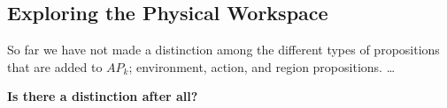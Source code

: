 \subsection{Exploring the Physical Workspace}

So far we have not made a distinction among the different types of propositions that are added to $AP_k$; environment, action, and region propositions. \ldots

\textbf{Is there a distinction after all?}


